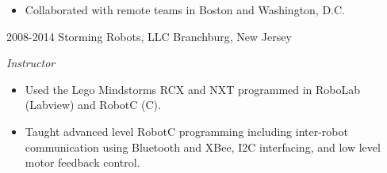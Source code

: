 \documentclass[]{friggeri-mlg-cv} %
\begin{document}
\begin{entrylist}
{\begin{itemize}[leftmargin=*]
\item Collaborated with remote teams in Boston and Washington, D.C.
\end{itemize}}
\entry
{2008-2014}
{Storming Robots, LLC}
{Branchburg, New Jersey}
{\emph{Instructor}
\begin{itemize}[leftmargin=*]
\item Used the Lego Mindstorms RCX and NXT programmed in RoboLab (Labview)  and RobotC (C).
\item Taught advanced level RobotC programming including inter-robot communication using Bluetooth and XBee, I2C interfacing, and low level motor feedback control.
\end{itemize}}
\end{entrylist}
%
\end{document}
